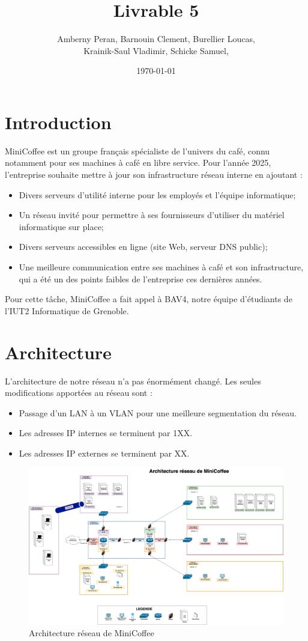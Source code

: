 \documentclass{article}
\title{Livrable 5}
\author{
Amberny Peran, Barnouin Clement, Burellier Loucas, \\
Krainik-Saul Vladimir, Schicke Samuel, 
}
\date{\today}
\begin{document}
\maketitle


\section{Introduction}
MiniCoffee est un groupe français spécialiste de l’univers du café, connu notamment pour ses machines à café en libre service. Pour l’année 2025, l’entreprise souhaite mettre à jour son infrastructure réseau interne en ajoutant : 
\begin{itemize}
    \item Divers serveurs d’utilité interne pour les employés et l'équipe informatique;
    \item Un réseau invité pour permettre à ses fournisseurs d’utiliser du matériel informatique sur place;
    \item Divers serveurs accessibles en ligne (site Web, serveur DNS public);
    \item Une meilleure communication entre ses machines à café et son infrastructure, qui a été un des points faibles de l’entreprise ces dernières années.
\end{itemize}
Pour cette tâche, MiniCoffee a fait appel à BAV4, notre équipe d’étudiants de l’IUT2 Informatique de Grenoble.

\section{Architecture}
L'architecture de notre réseau n'a pas énormément changé. 
Les seules modifications apportées au réseau sont : 
\begin{itemize}
    \item Passage d'un LAN à un VLAN pour une meilleure segmentation du réseau.
    \item Les adresses IP internes se terminent par 1XX.
    \item Les adresses IP externes se terminent par XX.
\end{itemize}

\begin{figure}
    \centering
    \includegraphics[width=1.2\textwidth, trim=0 0 0 2.3cm, clip]{../assets/Architecture.drawio.png}
    \caption{Architecture réseau de MiniCoffee}
\end{figure}
\end{document}
